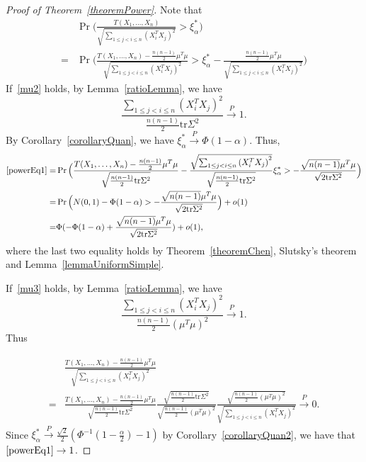 \documentclass[review]{elsarticle}
\theoremstyle{plain}
\theoremstyle{definition}
\theoremstyle{remark}
\begin{document}
\begin{proof}[Proof of Theorem~\ref{theoremPower}]
    Note that
    \begin{align}
            &\Pr\Big(\frac{T( X_1,\ldots, X_n)}{\sqrt{\sum_{1\leq j<i\leq n}{(X_i^T X_j)}^2}}>\xi_{\alpha}^* \Big)\nonumber\\
            =&
            \Pr\Big(\frac{T( X_1,\ldots, X_n)-\frac{n(n-1)}{2}\mu^T\mu}{\sqrt{\sum_{1\leq j<i\leq n}{(X_i^T X_j)}^2}}>\xi_{\alpha}^*-\frac{\frac{n(n-1)}{2}\mu^T\mu}{\sqrt{\sum_{1\leq j<i\leq n}{(X_i^T X_j)}^2}} \Big)
            \label{powerEq1}
    \end{align}
    If~\eqref{mu2} holds, by Lemma~\ref{ratioLemma}, we have
    $$
    \frac{\sum_{1\leq j< i\leq n}(X_i^T X_j)^2}{\frac{n(n-1)}{2}\mathrm{tr}\Sigma^2}\xrightarrow{P}1.
    $$
    By Corollary~\ref{corollaryQuan}, we have $\xi_{\alpha}^*\xrightarrow{P} \Phi(1-\alpha)$.
Thus,
    \begin{equation*}
        \begin{aligned}
            \eqref{powerEq1}=&
            \Pr\Big(\frac{T( X_1,\ldots, X_n)-\frac{n(n-1)}{2}\mu^T\mu}{\sqrt{\frac{n(n-1)}{2}\mathrm{tr}\Sigma^2}}-
            \frac{\sqrt{\sum_{1\leq j<i\leq n}{(X_i^T X_j)}^2}}{\sqrt{\frac{n(n-1)}{2}\mathrm{tr}\Sigma^2}}\xi_{\alpha}^*>
            -\frac{\sqrt{n(n-1)}\mu^T\mu}{\sqrt{2\mathrm{tr}\Sigma^2}} \Big)\\
            =&
            \Pr\Big(N(0,1)-\Phi(1-\alpha)>-\frac{\sqrt{n(n-1)}\mu^T\mu}{\sqrt{2\mathrm{tr}\Sigma^2}}\Big)+o(1)\\
            =&
            \Phi(-\Phi(1-\alpha)+\frac{\sqrt{n(n-1)}\mu^T\mu}{\sqrt{2\mathrm{tr}\Sigma^2}})+o(1),
        \end{aligned}
    \end{equation*}
    where the last two equality holds by Theorem~\ref{theoremChen}, Slutsky's theorem and Lemma~\ref{lemmaUniformSimple}.

    If~\eqref{mu3} holds, by Lemma~\ref{ratioLemma}, we have
    $$
    \frac{\sum_{1\leq j< i\leq n}(X_i^T X_j)^2}{\frac{n(n-1)}{2}{(\mu^T\mu)}^2}\xrightarrow{P}1.
    $$
    Thus
            
    \begin{equation*}
        \begin{aligned}
            &\frac{T( X_1,\ldots, X_n)-\frac{n(n-1)}{2}\mu^T\mu}{\sqrt{\sum_{1\leq j<i\leq n}{(X_i^T X_j)}^2}}        \\
            =&\frac{T( X_1,\ldots, X_n)-\frac{n(n-1)}{2}\mu^T\mu}{\sqrt{\frac{n(n-1)}{2}\mathrm{tr}\Sigma^2}}
            \frac{\sqrt{\frac{n(n-1)}{2}\mathrm{tr}\Sigma^2}}{\sqrt{\frac{n(n-1)}{2}{(\mu^T \mu)}^2}}        
            \frac{\sqrt{\frac{n(n-1)}{2}{(\mu^T \mu)}^2}}{\sqrt{\sum_{1\leq j<i\leq n}{(X_i^T X_j)}^2}}        
            \xrightarrow{P} 0.
        \end{aligned}
    \end{equation*}
    Since $\xi_{\alpha}^*\xrightarrow{P}\frac{\sqrt{2}}{2}(\Phi^{-1}(1-\frac{\alpha}{2})-1)$ by Corollary~\ref{corollaryQuan2},  we have that $\eqref{powerEq1}\to 1$.


\end{proof}
\end{document}
